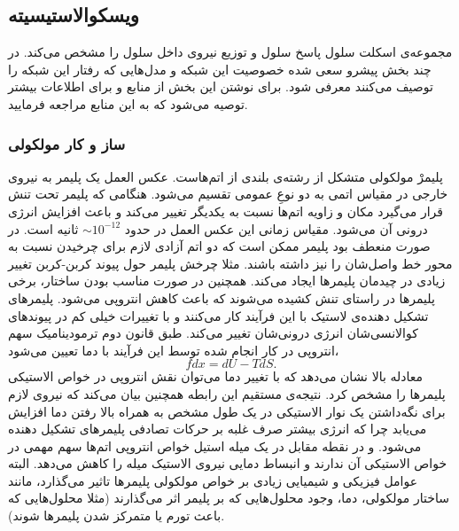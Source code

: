 \subsection{ویسکوالاستیسیته}
مجموعه‌ی اسکلت سلول پاسخ سلول و توزیع نیروی داخل سلول را مشخص می‌کند. در چند بخش  پیشرو سعی شده خصوصیت این شبکه و مدل‌هایی که رفتار این شبکه ‌را توصیف می‌کنند معرفی شود. برای نوشتن این بخش از منابع \cite{doi, Viscoelasticity, visco} و برای اطلاعات بیشتر توصیه می‌شود که به این منابع مراجعه فرمایید.
\subsubsection{ساز و کار مولکولی}
پلیمرْ مولکولی متشکل از رشته‌ی بلندی از اتم‌هاست. عکس العمل یک پلیمر به نیروی خارجی در مقیاس اتمی به دو نوعِ عمومی تقسیم می‌شود. هنگامی که پلیمر تحت تنش قرار می‌گیرد مکان و زاویه اتم‌ها  نسبت به یکدیگر تغییر می‌کند و باعث افزایش انرژی درونی‌ آن می‌شود. مقیاس زمانی این عکس العمل در حدود $\sim10^{-12}$ ثانیه است. در صورت منعطف بود پلیمر  ممکن است که دو اتم آزادی لازم برای چرخیدن نسبت به محور خط واصل‌شان را نیز داشته باشند. مثلا چرخش پلیمر حول پیوند‌ کربن-کربن تغییر زیادی در چیدمان پلیمر‌ها ایجاد می‌کند. همچنین در صورت مناسب بودن ساختار، برخی پلیمر‌ها در راستای تنش کشیده می‌شوند که باعث کاهش انتروپی  می‌شود. پلیمر‌های تشکیل دهنده‌ی لاستیک‌ با این فرآیند کار می‌کنند و با تغییرات خیلی کم در پیوند‌های کوالانسی‌شان انرژی درونی‌شان تغییر می‌کند. طبق قانون دوم ترمودینامیک سهم انتروپی در کار انجام شده توسط این فرآیند با دما تعیین می‌شود،
\begin{equation}
fdx=dU-TdS.\label{eq:second_thermo}
\end{equation}
معادله بالا نشان می‌دهد که با تغییر دما می‌توان نقش انتروپی در خواص الاستیکی پلیمر‌ها را مشخص کرد. نتیجه‌ی مستقیم این رابطه همچنین بیان می‌کند که نیروی لازم برای نگه‌داشتن یک نوار الاستیکی در یک طول مشخص به همراه بالا رفتن دما افزایش می‌یابد چرا که انرژی بیشتر صرف غلبه بر حرکات تصادفی پلیمر‌های تشکیل دهنده می‌شود. و در نقطه مقابل در یک میله استیل خواص انتروپی اتم‌ها سهم مهمی در خواص الاستیکی آن ندارند و انبساط دمایی نیروی الاستیک میله را کاهش می‌دهد.
البته عوامل فیزیکی و شیمیایی زیادی بر خواص مولکولی پلیمر‌ها تاثیر می‌گذارد، مانند ساختار مولکولی، دما، وجود محلول‌هایی که بر پلیمر اثر ‌می‌گذارند (مثلا محلول‌هایی که باعث تورم یا متمرکز شدن پلیمر‌ها شوند).  
